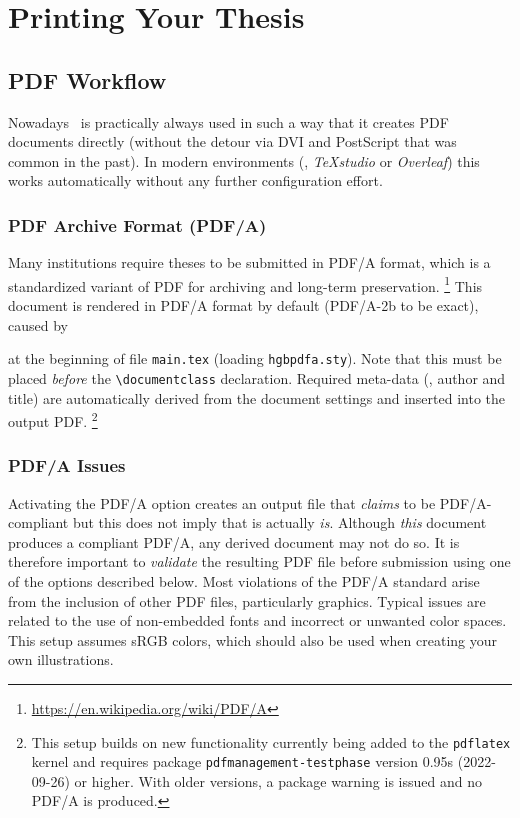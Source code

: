 \chapter{Printing Your Thesis}
\label{cha:Printing}


\section{PDF Workflow}
\label{sec:pdf-workflow}

Nowadays \latex\ is practically always used in such a way that it creates PDF
documents directly (without the detour via DVI and PostScript that was common
in the past). In modern environments (\eg, \emph{TeXstudio} or \emph{Overleaf})
this works automatically without any further configuration effort.


\subsection{PDF Archive Format (PDF/A)}
\label{sec:PDFA}

Many institutions require theses to be submitted in PDF/A format, which is a
standardized variant of PDF for archiving and long-term preservation.%
\footnote{\url{https://en.wikipedia.org/wiki/PDF/A}}
This document is rendered in PDF/A format by default (PDF/A-2b to be exact),
caused by
%
\begin{LaTeXCode}[numbers=none]
\RequirePackage{hgbpdfa}
\end{LaTeXCode}
%
at the beginning of file \verb!main.tex! (loading \verb!hgbpdfa.sty!).
Note that this must be placed \emph{before} the \verb!\documentclass!
declaration. Required meta-data (\eg, author and title) are automatically 
derived from the document settings and inserted into the output PDF.%
\footnote{This setup builds on new functionality currently being added to
the \texttt{pdflatex} kernel and requires package \texttt{pdfmanagement-testphase}
version 0.95s (2022-09-26) or higher. With older versions, a package warning is
issued and no PDF/A is produced.}


\subsection{PDF/A Issues}
\label{sec:PDFA-issues}

Activating the PDF/A option creates an output file that \emph{claims} to be 
PDF/A-compliant but this does not imply that is actually \emph{is}.
Although \emph{this} document produces a compliant PDF/A, any derived document
may not do so. It is therefore important to \emph{validate} the resulting PDF file
before submission using one of the options described below. Most violations
of the PDF/A standard arise from the inclusion of other PDF files, particularly 
graphics. Typical issues are related to the use of non-embedded fonts
and incorrect or unwanted color spaces. This setup assumes sRGB colors, 
which should also be used when creating your own illustrations.


